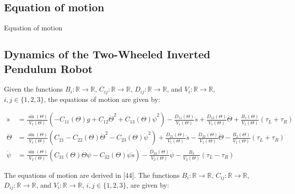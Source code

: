 	\subsection{Equation of motion }
	Equation of motion 
	
	
		\subsection{Dynamics of the Two-Wheeled Inverted Pendulum Robot}
	Given the functions $B_i: \mathbb{R} \rightarrow \mathbb{R}$, $C_{ij}: \mathbb{R} \rightarrow \mathbb{R}$, $D_{ij}: \mathbb{R} \rightarrow \mathbb{R}$, and $V_i: \mathbb{R} \rightarrow \mathbb{R}$, $i,j \in \{1,2,3\}$, the equations of motion are given by:

	\begin{align}
		\ddot{s} &= \frac{\sin(\Theta)}{V_1(\Theta)} \left( -C_{11}(\Theta)g + C_{12}\dot{\Theta}^2 + C_{13}(\Theta)\dot{\psi}^2 \right) - \frac{D_{11}(\Theta)}{V_1(\Theta)}\dot{s} + \frac{D_{12}(\Theta)}{V_1(\Theta)}\dot{\Theta} + \frac{B_{1}(\Theta)}{V_1(\Theta)}(\tau_L + \tau_R) \\
		\ddot{\Theta} &= \frac{\sin(\Theta)}{V_1(\Theta)} \left( C_{21} - C_{22}(\Theta)\dot{\Theta}^2 - C_{23}(\Theta)\dot{\psi}^2 \right) + \frac{D_{21}(\Theta)}{V_1(\Theta)}\dot{s} - \frac{D_{22}(\Theta)}{V_1(\Theta)}\dot{\Theta} - \frac{B_{2}(\Theta)}{V_1(\Theta)}(\tau_L + \tau_R)  \\
		\ddot{\psi} &= \frac{\sin(\Theta)}{V_2(\Theta)} \left( C_{31}(\Theta)\dot{\Theta}\dot{\psi} - C_{32}(\Theta)\dot{\psi}\dot{s} \right) - \frac{D_{33}(\Theta)}{V_2(\Theta)}\dot{\psi} - \frac{B_{3}}{V_2(\Theta)}(\tau_L - \tau_R)
	\end{align}


	The equations of motion are derived in [44]. The functions $B_i: \mathbb{R} \rightarrow \mathbb{R}$, $C_{ij}: \mathbb{R} \rightarrow \mathbb{R}$, $D_{ij}: \mathbb{R} \rightarrow \mathbb{R}$, and $V_i: \mathbb{R} \rightarrow \mathbb{R}$, $i,j \in \{1,2,3\}$, are given by:

